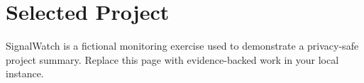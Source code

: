 \section{Selected Project}
\begin{cvparagraph}
  SignalWatch is a fictional monitoring exercise used to demonstrate a privacy-safe
  project summary. Replace this page with evidence-backed work in your local instance.
\end{cvparagraph}
